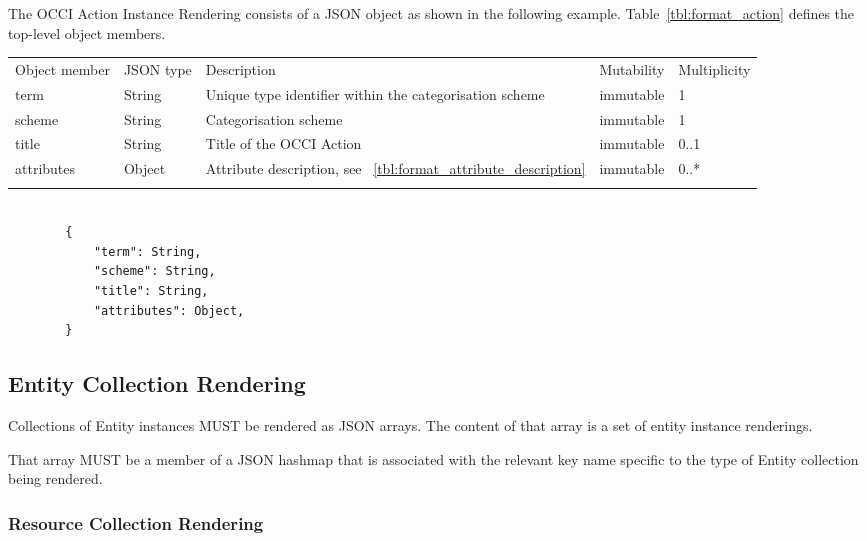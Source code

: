 \documentclass[10pt,a4paper]{article}
\begin{document}
The OCCI Action Instance Rendering consists of a JSON object as shown in the
following example.
Table~\ref{tbl:format_action} defines the top-level object members.

 {
    \begin{tabularx}{\textwidth}{llXll}
    \toprule
    Object member & JSON type & Description & Mutability & Multiplicity \\
    \colrule
    term & String & Unique type identifier within the categorisation scheme &
immutable & 1 \\

    scheme & String & Categorisation scheme & immutable & 1 \\
    
    title & String & Title of the OCCI Action & immutable & 0..1 \\
    
    attributes & Object & Attribute description, see
~\ref{tbl:format_attribute_description} & immutable & 0..* \\
    \botrule
    \end{tabularx}
}

\begin{lstlisting}

        {
            "term": String,
            "scheme": String,
            "title": String,
            "attributes": Object,
        }

\end{lstlisting}



\subsection{Entity Collection Rendering}
Collections of Entity instances MUST be rendered as JSON arrays. The content of that array is a set of entity instance renderings.

That array MUST be a member of a JSON hashmap that is associated with the relevant key name specific to the type of Entity collection being rendered.

\subsubsection{Resource Collection Rendering}
\end{document}
